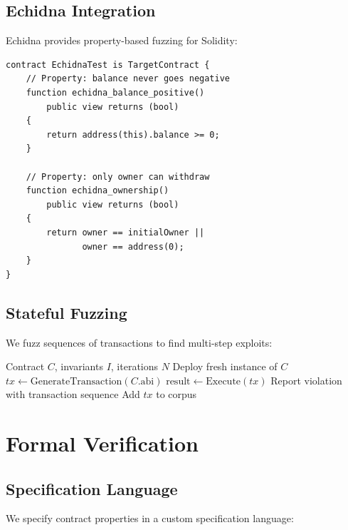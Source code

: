 \documentclass[11pt,a4paper]{article}
\theoremstyle{definition}
\begin{document}
\subsection{Echidna Integration}

Echidna provides property-based fuzzing for Solidity:

\begin{lstlisting}
contract EchidnaTest is TargetContract {
    // Property: balance never goes negative
    function echidna_balance_positive()
        public view returns (bool)
    {
        return address(this).balance >= 0;
    }

    // Property: only owner can withdraw
    function echidna_ownership()
        public view returns (bool)
    {
        return owner == initialOwner ||
               owner == address(0);
    }
}
\end{lstlisting}

\subsection{Stateful Fuzzing}

We fuzz sequences of transactions to find multi-step exploits:

\begin{algorithm}
\caption{Stateful Contract Fuzzing}
\begin{algorithmic}[1]
\Require Contract $C$, invariants $I$, iterations $N$
\State Deploy fresh instance of $C$
    \State $tx \gets \text{GenerateTransaction}(C.\text{abi})$
    \State $\text{result} \gets \text{Execute}(tx)$
        \If{$\neg \phi()$}
            \State Report violation with transaction sequence
        \EndIf
    \EndFor
        \State Add $tx$ to corpus
    \EndIf
\EndFor
\end{algorithmic}
\end{algorithm}

\section{Formal Verification}

\subsection{Specification Language}

We specify contract properties in a custom specification language:
\end{document}
